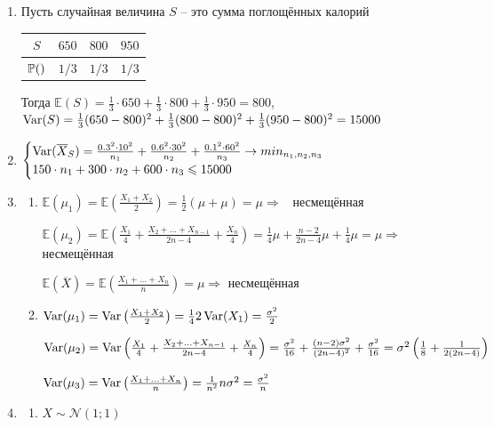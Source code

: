 \documentclass[12pt, a4paper]{article}\usepackage[]{graphicx}\usepackage[]{color}
\begin{document}
\begin{enumerate}
	\item Пусть случайная величина $S$ – это сумма поглощённых калорий

		\begin{tabular}{c|ccc}
			$S$ & $650$ & $800$ & $950$ \\
			\hline
			$\P()$ & $1/3$ & $1/3$ & $1/3$ \\
		\end{tabular}

		Тогда $\mathbb{E}(S) = \frac{1}{3}\cdot 650 +  \frac{1}{3}\cdot 800 +  \frac{1}{3}\cdot 950 = 800$, $\Var(S) = \frac{1}{3}(650-800)^2 + \frac{1}{3}(800-800)^2 + \frac{1}{3}(950-800)^2 = 15000$

	\item
		$
		\begin{cases}
		\Var(\overline{X}_S) = \frac{0.3^2\cdot 10^2}{n_1} + \frac{0.6^2 \cdot 30^2}{n_2} + \frac{0.1^2 \cdot 60^2}{n_3} \to min_{n_1, n_2, n_3} \\
		150\cdot n_1 + 300 \cdot n_2 + 600 \cdot n_3 \leq 15000
		\end{cases}
		$

	\item
		\begin{enumerate}
			\item $\mathbb{E}(\mu_1) = \mathbb{E}\left(\frac{X_1+X_2}{2}\right)  = \frac{1}{2}(\mu+\mu) = \mu \Rightarrow$  несмещённая

			$\mathbb{E}(\mu_2) = \mathbb{E} \left(\frac{X_1}{4} + \frac{X_2+\ldots+X_{n-1}}{2n-4} + \frac{X_n}{4}\right) = \frac{1}{4}\mu + \frac{n-2}{2n-4}\mu + \frac{1}{4}\mu = \mu \Rightarrow$ несмещённая

			$\mathbb{E}(\overline{X}) = \mathbb{E}\left(\frac{X_1 + \ldots + X_n}{n}\right) = \mu \Rightarrow$ несмещённая

			\item $\Var(\mu_1) = \Var\left(\frac{X_1+X_2}{2}\right)  = \frac{1}{4}2\Var(X_1) = \frac{\sigma^2}{2}$

			$\Var(\mu_2) = \Var \left(\frac{X_1}{4} + \frac{X_2+\ldots+X_{n-1}}{2n-4} + \frac{X_n}{4}\right)  = \frac{\sigma^2}{16} + \frac{(n-2)\sigma^2}{(2n-4)^2} + \frac{\sigma^2}{16} = \sigma^2\left(\frac{1}{8} + \frac{1}{2(2n-4)} \right)$

			$\Var(\mu_3) = \Var\left(\frac{X_1 + \ldots + X_n}{n}\right)  = \frac{1}{n^2}n\sigma^2 = \frac{\sigma^2}{n}$
		\end{enumerate}

	\item
		\begin{enumerate}
			\item $X \sim \mathcal{N} (1;1)$


\end{enumerate}
\end{enumerate}
\end{document}

